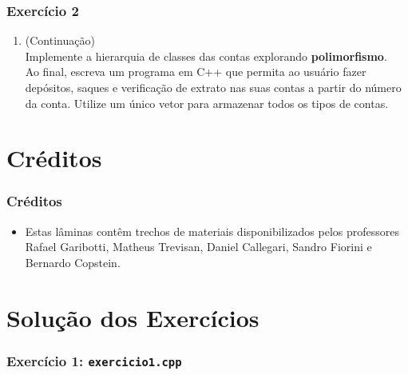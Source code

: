 \documentclass[aspectratio=169]{beamer}
\newcommand\setItemnumber[1]{\setcounter{enumi}{\numexpr#1-1\relax}}
\begin{document}
\begin{frame}[fragile]\frametitle{Exercício 2}
\begin{enumerate}
	\setItemnumber{2}
	\item (Continuação)\\
	Implemente a hierarquia de classes das contas explorando \textbf{polimorfismo}.\\
	Ao final, escreva um programa em C++ que permita ao usuário fazer depósitos, saques e verificação de extrato nas suas contas a partir do número da conta. Utilize um único vetor para armazenar todos os tipos de contas.
\end{enumerate}
\end{frame}

\section{Créditos}

\begin{frame}\frametitle{Créditos}
\begin{itemize}	
	\item Estas lâminas contêm trechos de materiais disponibilizados pelos professores Rafael Garibotti, Matheus Trevisan, Daniel Callegari, Sandro Fiorini e Bernardo Copstein.
\end{itemize}
\end{frame}

\section{Solução dos Exercícios}

\begin{frame}\frametitle{Exercício 1: \texttt{exercicio1.cpp}}
\fontsize{3pt}{5pt}\selectfont{

}
\end{frame}

\end{document}
